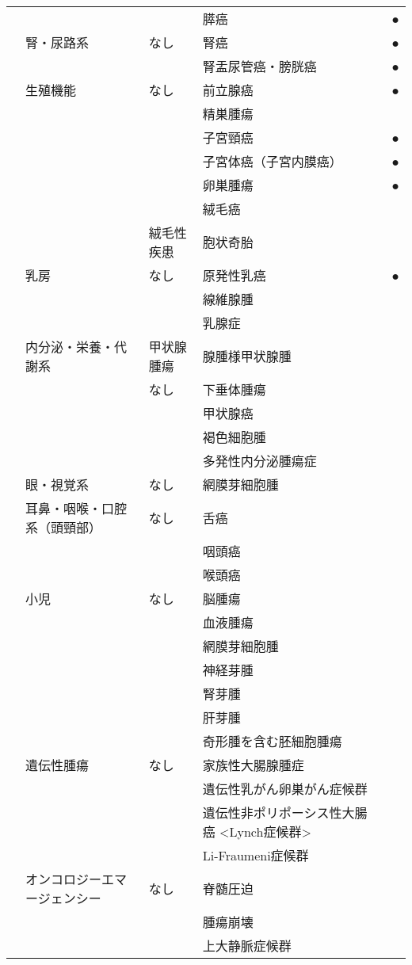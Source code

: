 \begin{xltabular}{\linewidth}{XXXXX}
 &  &  & 膵癌 & ● \\
 & 腎・尿路系 & なし & 腎癌 & ● \\
 &  &  & 腎盂尿管癌・膀胱癌 & ● \\
 & 生殖機能 & なし & 前立腺癌 & ● \\
 &  &  & 精巣腫瘍 &  \\
 &  &  & 子宮頸癌 & ● \\
 &  &  & 子宮体癌（子宮内膜癌） & ● \\
 &  &  & 卵巣腫瘍 & ● \\
 &  &  & 絨毛癌 &  \\
 &  & 絨毛性疾患 & 胞状奇胎 &  \\
 & 乳房 & なし & 原発性乳癌 & ● \\
 &  &  & 線維腺腫 &  \\
 &  &  & 乳腺症 &  \\
 & 内分泌・栄養・代謝系 & 甲状腺腫瘍 & 腺腫様甲状腺腫 &  \\
 &  & なし & 下垂体腫瘍 &  \\
 &  &  & 甲状腺癌 &  \\
 &  &  & 褐色細胞腫 &  \\
 &  &  & 多発性内分泌腫瘍症 &  \\
 & 眼・視覚系 & なし & 網膜芽細胞腫 &  \\
 & 耳鼻・咽喉・口腔系（頭頸部） & なし & 舌癌 &  \\
 &  &  & 咽頭癌 &  \\
 &  &  & 喉頭癌 &  \\
 & 小児 & なし & 脳腫瘍 &  \\
 &  &  & 血液腫瘍 &  \\
 &  &  & 網膜芽細胞腫 &  \\
 &  &  & 神経芽腫 &  \\
 &  &  & 腎芽腫 &  \\
 &  &  & 肝芽腫 &  \\
 &  &  & 奇形腫を含む胚細胞腫瘍 &  \\
 & 遺伝性腫瘍 & なし & 家族性大腸腺腫症 &  \\
 &  &  & 遺伝性乳がん卵巣がん症候群 &  \\
 &  &  & 遺伝性非ポリポーシス性大腸癌 <Lynch症候群> &  \\
 &  &  & Li-Fraumeni症候群 &  \\
 & オンコロジーエマージェンシー & なし & 脊髄圧迫 &  \\
 &  &  & 腫瘍崩壊 &  \\
 &  &  & 上大静脈症候群 &  \\

\end{xltabular}
